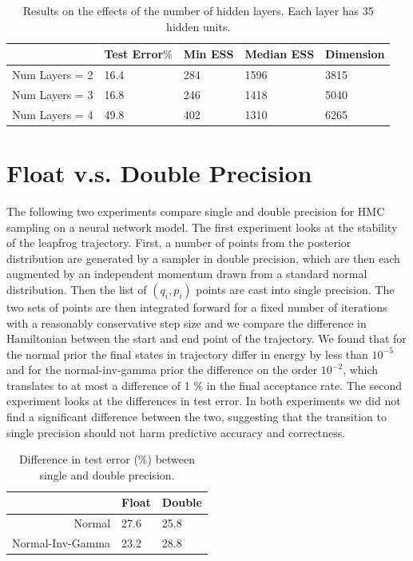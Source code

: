 \documentclass[12pt]{report}
\begin{document}
\begin{table}[]
\centering
\begin{tabular}{@{}lllll@{}}
\toprule
            & Test Error$\%$ & Min ESS & Median ESS & Dimension \\ \midrule
Num Layers = 2 & 16.4    & 284 & 1596       & 3815        \\ \midrule
Num Layers = 3  & 16.8  & 246 & 1418     & 5040        \\ \midrule
Num Layers = 4  & 49.8  & 402 & 1310    & 6265        \\ \bottomrule
\end{tabular}
\caption{Results on the effects of the number of hidden layers. Each layer has 35 hidden units.}
\label{my-label}
\end{table}

\section{Float v.s. Double Precision}
The following two experiments compare single and double precision for HMC sampling on a neural network model. The first experiment looks at the stability of the leapfrog trajectory. First, a number of points from the posterior distribution are generated by a sampler in double precision, which are then each augmented by an independent momentum drawn from a standard normal distribution. Then the list of $(q_i,p_i)$ points are cast into single precision. The two sets of points are then integrated forward for a fixed number of iterations with a reasonably conservative step size and we compare the difference in Hamiltonian between the start and end point of the trajectory. We found that for the normal prior the final states in trajectory differ in energy by less than $10^{-5}$ and for the normal-inv-gamma prior the difference on the order $10^{-2}$, which translates to at most a difference of 1 $\%$ in the final acceptance rate. The second experiment looks at the differences in test error. In both experiments we did not find a significant difference between the two, suggesting that the transition to single precision should not harm predictive accuracy and correctness. 

\begin{table}[]
\centering
\begin{tabular}{@{}rll@{}}
\toprule
\multicolumn{1}{l}{} & Float & \multicolumn{1}{r}{Double} \\ \midrule
Normal               & 27.6   & 25.8                         \\ \midrule
Normal-Inv-Gamma     & 23.2  & 28.8                         \\ \bottomrule
\end{tabular}
\caption{Difference in test error ($\%$) between single and double precision.}
\end{table}
\end{document}
